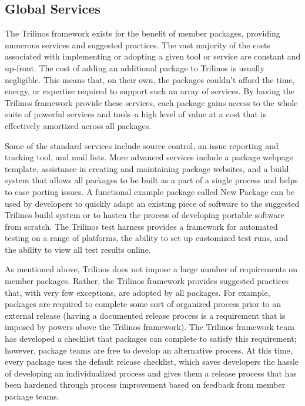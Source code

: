 \documentclass{doublecol}
\begin{document}
\subsection{Global Services}
\label{subsect:GlobalServices}

The Trilinos framework exists for the benefit of member packages,
providing numerous services and suggested practices.  The vast
majority of the costs associated with implementing or adopting a
given tool or service are constant and up-front.  The cost of adding
an additional package to Trilinos is usually negligible.  This means
that, on their own, the packages couldn't afford the time, energy,
or expertise required to support such an array of services.  By
having the Trilinos framework provide these services, each package
gains access to the whole suite of powerful services and tools--a
high level of value at a cost that is effectively amortized across
all packages.

Some of the standard services include source control, an issue
reporting and tracking tool, and mail lists.  More advanced services
include a package webpage template, assistance in creating and
maintaining package websites, and a build system that allows all
packages to be built as a part of a single process and helps to ease
porting issues.  A functional example package called New Package can
be used by developers to quickly adapt an existing piece of software
to the suggested Trilinos build system or to hasten the process of
developing portable software from scratch.  The Trilinos test
harness provides a framework for automated testing on a range of
platforms, the ability to set up customized test runs, and the
ability to view all test results online.

As mentioned above, Trilinos does not impose a large number of
requirements on member packages.  Rather, the Trilinos framework
provides suggested practices that, with very few exceptions, are
adopted by all packages. For example, packages are required to
complete some sort of organized process prior to an external release
(having a documented release process is a requirement that is
imposed by powers above the Trilinos framework).  The Trilinos
framework team has developed a checklist that packages can complete
to satisfy this requirement; however, package teams are free to
develop an alternative process.  At this time, every package uses
the default release checklist, which saves developers the hassle of
developing an individualized process and gives them a release
process that has been hardened through process improvement based on
feedback from member package teams.
\end{document}

